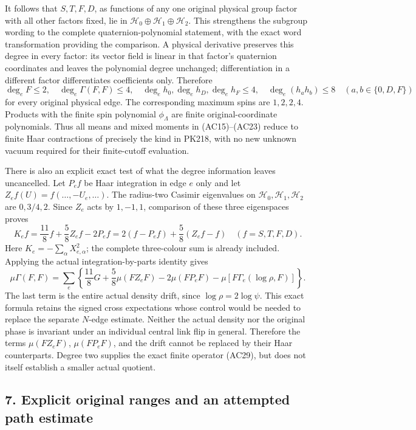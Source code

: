 \documentclass[11pt]{article}
\begin{document}
It follows that \(S,T,F,D\), as functions of any one original physical group factor with all other factors fixed, lie in \(\mathcal H_0\oplus\mathcal H_1\oplus\mathcal H_2\). This strengthens the subgroup wording to the complete quaternion-polynomial statement, with the exact word transformation providing the comparison. A physical derivative preserves this degree in every factor: its vector field is linear in that factor's quaternion coordinates and leaves the polynomial degree unchanged; differentiation in a different factor differentiates coefficients only. Therefore
\[
 \deg_e F\le2,\quad
 \deg_e\Gamma(F,F)\le4,\quad
 \deg_e h_0,\deg_e h_D,\deg_e h_F\le4,\quad
 \deg_e(h_ah_b)\le8
       \quad(a,b\in\{0,D,F\})
 \tag{AC28}
\]
for every original physical edge. The corresponding maximum spins are \(1,2,2,4\). Products with the finite spin polynomial \(\phi_\Lambda\) are finite original-coordinate polynomials. Thus all means and mixed moments in (AC15)–(AC23) reduce to finite Haar contractions of precisely the kind in PK218, with no new unknown vacuum required for their finite-cutoff evaluation.

There is also an explicit exact test of what the degree information leaves uncancelled. Let \(P_ef\) be Haar integration in edge \(e\) only and let \(Z_ef(U)=f(\ldots,-U_e,\ldots)\). The radius-two Casimir eigenvalues on \(\mathcal H_0,\mathcal H_1,\mathcal H_2\) are \(0,3/4,2\). Since \(Z_e\) acts by \(1,-1,1\), comparison of these three eigenspaces proves
\[
 K_ef=\frac{11}{8}f+\frac58Z_ef-2P_ef
     =2(f-P_ef)+\frac58(Z_ef-f)
          \quad(f=S,T,F,D).
 \tag{AC29}
\]
Here \(K_e=-\sum_\alpha X_{e,\alpha}^2\); the complete three-colour sum is already included. Applying the actual integration-by-parts identity gives
\[
 \mu\Gamma(F,F)
 =\sum_e\left\{
   \frac{11}{8}G+\frac58\mu(FZ_eF)
       -2\mu(FP_eF)-\mu[F\Gamma_e(\log\rho,F)]\right\}.
 \tag{AC30}
\]
The last term is the entire actual density drift, since \(\log\rho=2\log\psi\). This exact formula retains the signed cross expectations whose control would be needed to replace the separate \(N\)-edge estimate. Neither the actual density nor the original phase is invariant under an individual central link flip in general. Therefore the terms \(\mu(FZ_eF)\), \(\mu(FP_eF)\), and the drift cannot be replaced by their Haar counterparts. Degree two supplies the exact finite operator (AC29), but does not itself establish a smaller actual quotient.

\subsection*{7. Explicit original ranges and an attempted path estimate}
\end{document}
